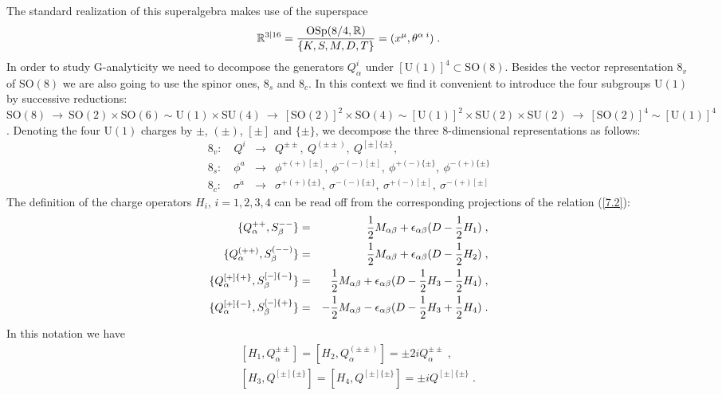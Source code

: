 \documentclass[a4paper,12pt]{article}
\begin{document}
The standard realization of this superalgebra makes use of the 
superspace 
\begin{equation}
{\mathbb R}^{3\vert 16} = {\mbox{OSp}(8/4,\mathbb{R})\over 
\{K,S,M,D,T\}} = (x^\mu,\theta^{\alpha\; i})\;. \label{7.5} 
\end{equation}
In order to study G-analyticity we need to decompose the 
generators $Q^i_\alpha$ under $[\mbox{U}(1)]^4\subset 
\mbox{SO}(8)$. Besides the vector representation $8_v$ of 
$\mbox{SO}(8)$ we are also going to use the spinor ones, $8_s$ and 
$8_c$. In this context we find it convenient to introduce the four 
subgroups $\mbox{U}(1)$  by successive reductions: $\mbox{SO}(8)\ 
\rightarrow \ \mbox{SO}(2)\times \mbox{SO}(6)\sim 
\mbox{U}(1)\times \mbox{SU}(4) \ \rightarrow \ 
[\mbox{SO}(2)]^2\times \mbox{SO}(4)\sim [\mbox{U}(1)]^2\times 
\mbox{SU}(2)\times \mbox{SU}(2) \ \rightarrow \ [\mbox{SO}(2)]^4 
\sim [\mbox{U}(1)]^4$. Denoting the four $\mbox{U}(1)$ charges by 
$\pm$, $(\pm)$, $[\pm]$ and $\{\pm\}$, we decompose the three 
8-dimensional representations as follows: 
\begin{eqnarray}
8_v:\quad Q^i &\rightarrow& Q^{\pm\pm}, \ Q^{(\pm\pm)}, \
Q^{[\pm]\{\pm\}},\label{7.10}\\
 8_s:\quad \phi^a &\rightarrow&
\phi^{+(+)[\pm]}, \ \phi^{-(-)[\pm]}, \ \phi^{+(-)\{\pm\}}, \
\phi^{-(+)\{\pm\}}\label{7.11}\\
 8_c:\quad  \sigma^{\dot a} &\rightarrow& \sigma^{+(+)\{\pm\}},
\ \sigma^{-(-)\{\pm\}}, \ \sigma^{+(-)[\pm]}, \ 
\sigma^{-(+)[\pm]}\label{7.12}
\end{eqnarray}
The definition of the charge operators $H_i$, $i=1,2,3,4$ can be 
read off from the corresponding projections of the relation 
(\ref{7.2}):  
\begin{eqnarray}
 \{Q^{++}_\alpha, S^{--}_\beta\} &=& {1\over 2} M_{\alpha\beta} + 
\epsilon_{\alpha\beta}  (D-{1\over 2}H_1) \;, \nonumber\\ 
  \{Q^{(++)}_\alpha, S^{(--)}_\beta\} &=& {1\over 2} M_{\alpha\beta} + 
\epsilon_{\alpha\beta}  (D - {1\over 2}H_2) \;, \nonumber\\ 
   \{Q^{[+]\{+\}}_\alpha, S^{[-]\{-\}}_\beta\} &=& {1\over 2} M_{\alpha\beta} + 
\epsilon_{\alpha\beta}  (D - {1\over 2}H_3  - {1\over 2}H_4) \;, 
\nonumber\\  
   \{Q^{[+]\{-\}}_\alpha, S^{[-]\{+\}}_\beta\} &=& -{1\over 2} M_{\alpha\beta} - 
\epsilon_{\alpha\beta}  (D - {1\over 2}H_3  + {1\over 2}H_4) \; . 
\label{7.9} 
\end{eqnarray}
In this notation we have
\begin{eqnarray}
  &&[H_1, Q^{\pm\pm}_\alpha ] = [H_2, Q^{(\pm\pm)}_\alpha ] = 
\pm 2i Q^{\pm\pm}_\alpha\;, \nonumber\\
  &&[H_3, Q^{[\pm]\{\pm\}}] = [H_4, Q^{[\pm]\{\pm\}}] = \pm i 
Q^{[\pm]\{\pm\}}\;. \label{7.13} 
\end{eqnarray}
\end{document}
